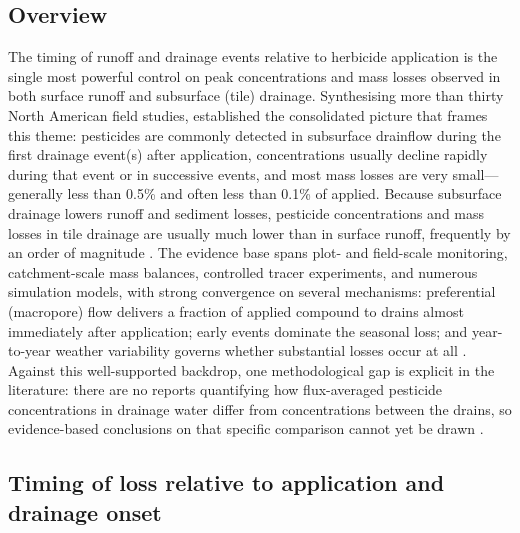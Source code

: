 \subsection{Overview}
The timing of runoff and drainage events relative to herbicide application is the single most powerful control on peak concentrations and mass losses observed in both surface runoff and subsurface (tile) drainage. Synthesising more than thirty North American field studies, \textcite{Kladivko2001} established the consolidated picture that frames this theme: pesticides are commonly detected in subsurface drainflow during the first drainage event(s) after application, concentrations usually decline rapidly during that event or in successive events, and most mass losses are very small---generally less than 0.5\% and often less than 0.1\% of applied. Because subsurface drainage lowers runoff and sediment losses, pesticide concentrations and mass losses in tile drainage are usually much lower than in surface runoff, frequently by an order of magnitude \parencite{Kladivko2001}. The evidence base spans plot- and field-scale monitoring, catchment-scale mass balances, controlled tracer experiments, and numerous simulation models, with strong convergence on several mechanisms: preferential (macropore) flow delivers a fraction of applied compound to drains almost immediately after application; early events dominate the seasonal loss; and year-to-year weather variability governs whether substantial losses occur at all \parencite{Kladivko2001}. Against this well-supported backdrop, one methodological gap is explicit in the literature: there are no reports quantifying how flux-averaged pesticide concentrations in drainage water differ from concentrations between the drains, so evidence-based conclusions on that specific comparison cannot yet be drawn \parencite{Jacobsen2007}.

\subsection{Timing of loss relative to application and drainage onset}

